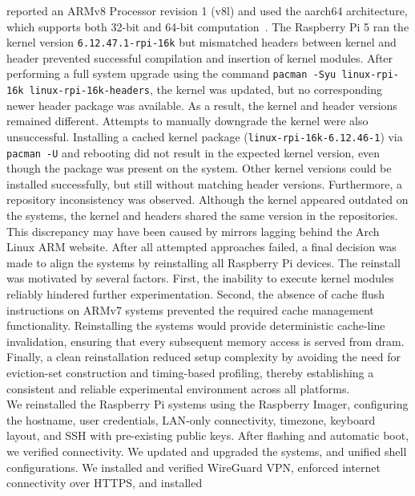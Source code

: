     reported an ARMv8 Processor revision 1 (v8l) and used the aarch64 architecture, which supports both 
    32-bit and 64-bit computation~\cite{paperTriggeringRHHardwareFault}. The Raspberry Pi 5 ran the kernel version 
    \texttt{6.12.47.1-rpi-16k} but mismatched headers between kernel and header prevented successful compilation and insertion of kernel modules.
    After performing a full system upgrade using the command
    \texttt{pacman -Syu linux-rpi-16k linux-rpi-16k-headers}, the kernel was updated, but no corresponding newer header 
    package was available. As a result, the kernel and header versions remained different. Attempts to manually 
    downgrade the kernel were also unsuccessful. Installing a cached kernel package (\texttt{linux-rpi-16k-6.12.46-1}) via 
    \texttt{pacman -U} and rebooting did not result in the expected kernel version, even though the package was present on 
    the system. Other kernel versions could be installed successfully, but still without matching header versions. 
    Furthermore, a repository inconsistency was observed. Although the kernel appeared outdated on the systems, the 
    kernel and headers shared the same version in the repositories. This discrepancy may have been caused by mirrors 
    lagging behind the Arch Linux ARM website.
    After all attempted approaches failed, a final decision was made to align the systems by reinstalling all Raspberry 
    Pi devices. The reinstall was motivated by several factors. First, the inability to execute kernel modules reliably 
    hindered further experimentation. Second, the absence of cache flush instructions on ARMv7 systems prevented the 
    required cache management functionality. Reinstalling the systems would provide deterministic cache-line invalidation, 
    ensuring that every subsequent memory access is served from \gls{dram}. Finally, a clean reinstallation reduced setup complexity by avoiding the need for eviction-set 
    construction and timing-based profiling, thereby establishing a consistent and reliable experimental environment 
    across all platforms.
    \\
    We reinstalled the Raspberry Pi systems using the Raspberry Imager, configuring the hostname, user credentials, 
    LAN-only connectivity, timezone, keyboard layout, and SSH with pre-existing public keys. After flashing and automatic 
    boot, we verified connectivity. We updated and upgraded the systems, and unified shell 
    configurations. We installed and verified WireGuard VPN, enforced internet connectivity over HTTPS, and installed 
